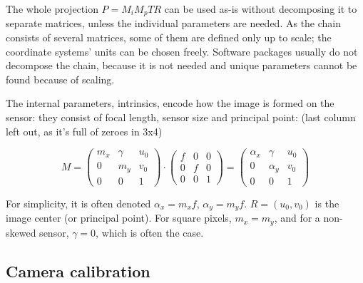 The whole projection $P = M_i M_p T R$ can be used as-is without decomposing it to separate matrices, unless the individual parameters are needed. As the chain consists of several matrices, some of them are defined only up to scale; the coordinate systems' units can be chosen freely. Software packages usually do not decompose the chain, because it is not needed and unique parameters cannot be found because of scaling.


The internal parameters, intrinsics, encode how the image is formed on the sensor: they consist of focal length, sensor size and principal point: (last column left out, as it's full of zeroes in 3x4)

\begin{equation}
	M =
	\begin{pmatrix}
		m_x & \gamma & u_0\\
		0   &    m_y & v_0\\
		0   &        0 & 1
	\end{pmatrix}
\cdot
	\begin{pmatrix}
		f & 0 & 0\\
		0 & f & 0\\
		0 & 0 & 1
	\end{pmatrix}
	=
	\begin{pmatrix}
		\alpha_x & \gamma   & u_0\\
		0        & \alpha_y & v_0\\
		0        & 0        & 1
	\end{pmatrix}
\end{equation}

For simplicity, it is often denoted $\alpha_x = m_x f$, $\alpha_y = m_y f$. $R = (u_0, v_0)$ is the image center (or principal point). For square pixels, $m_x = m_y$, and for a non-skewed sensor, $\gamma = 0$, which is often the case. \cite{hartley03multiview,szeliski10vision,heyden2005multiple}



\subsection{Camera calibration} %

